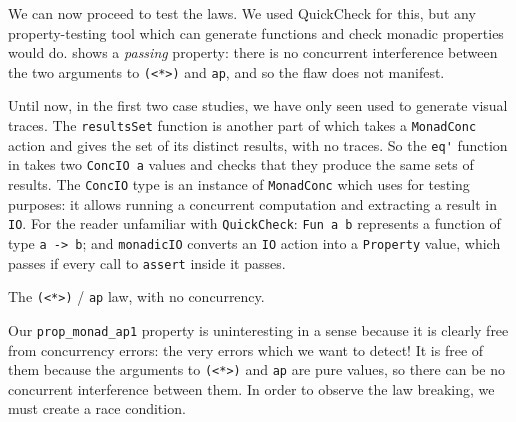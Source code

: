 We can now proceed to test the laws.  We used
QuickCheck\cite{claessen2000} for this, but any property-testing tool
which can generate functions and check monadic properties would do.
 shows a \emph{passing} property: there is no
concurrent interference between the two arguments to \verb|(<*>)| and
\verb|ap|, and so the flaw does not manifest.

Until now, in the first two case studies, we have only seen \dejafu{}
used to generate visual traces.  The \verb|resultsSet| function is
another part of \dejafu{} which takes a \verb|MonadConc| action and
gives the set of its distinct results, with no traces.  So the
\verb|eq'| function in  takes two \verb|ConcIO a|
values and checks that they produce the same sets of results.  The
\verb|ConcIO| type is an instance of \verb|MonadConc| which \dejafu{}
uses for testing purposes: it allows running a concurrent computation
and extracting a result in \verb|IO|.  For the reader unfamiliar with
\verb|QuickCheck|: \verb|Fun a b| represents a function of type
\verb|a -> b|; and \verb|monadicIO| converts an \verb|IO| action into
a \verb|Property| value, which passes if every call to \verb|assert|
inside it passes.

\begin{listing}
\centering
{}
\caption{The \texttt{(<*>)} / \texttt{ap} law, with no concurrency.}\label{lst:aplaw1}
\end{listing}

Our \verb|prop_monad_ap1| property is uninteresting in a sense because
it is clearly free from concurrency errors: the very errors which we
want to detect!  It is free of them because the arguments to
\verb|(<*>)| and \verb|ap| are pure values, so there can be no
concurrent interference between them.  In order to observe the law
breaking, we must create a race condition.

